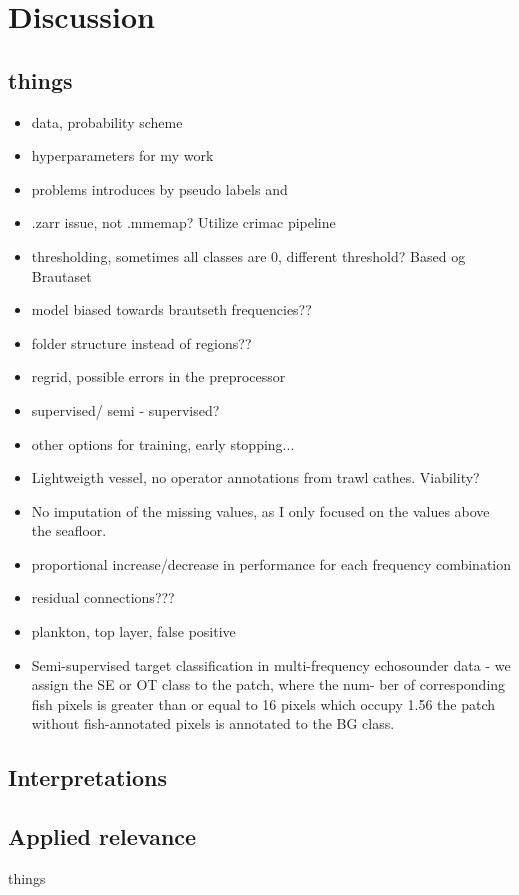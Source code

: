 \chapter{Discussion}
    \section{things}
        \begin{itemize}
            \item data, probability scheme
            \item hyperparameters for my work
            \item problems introduces by pseudo labels and 
            \item .zarr issue, not .mmemap? Utilize crimac pipeline
            \item thresholding, sometimes all classes are 0, different threshold? Based og Brautaset
            \item model biased towards brautseth frequencies??
            \item folder structure instead of regions??
            \item regrid, possible errors in the preprocessor 
            \item supervised/ semi - supervised? 
            \item other options for training, early stopping...
            \item Lightweigth vessel, no operator annotations from trawl cathes. Viability?
            \item No imputation of the missing values, as I only focused on the values above the seafloor.
            \item proportional increase/decrease in performance for each frequency combination 
            \item residual connections??? \cite{zhang2018road}
            \item plankton, top layer, false positive
            \item Semi-supervised target classification in multi-frequency
echosounder data - we assign the SE or OT class to the patch, where the num-
ber of corresponding fish pixels is greater than or equal to 16 pixels
which occupy 1.56%
the patch without fish-annotated pixels is annotated to the BG class.
        \end{itemize}

    \section{Interpretations}
    \section{Applied relevance}
        things
    